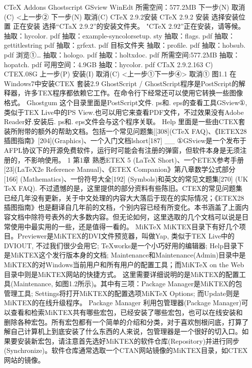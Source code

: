 \documentclass[UTF8]{ctexart}
\begin{document}
CTeX Addons
Ghostscript
GSview
WinEdt
所需空间：577.2MB
下一步(N)
取消(C)
<上一步②
下一步(N)
取消(C)
CTeX 2.9.2安装
CTeX 2.9.2 安装
选择安装位置
正在安装
选择“CTaX 2.9.2”的安装文件夹。
"CTeX 2.92”正在安装，请等候。
抽取：hycolor. pdf
抽取：example-syncolorsetup. sty
抽取：flags. pdf
抽取：gettitlestring pdf
抽取：grfext. pdf
目标文件夹
抽取：profile. pdf
抽取：hobsub. pdf
浏览①…
抽取：hologo. pdf
抽取：holtxdoc. pdf
所需空间:577.2MB
抽取：hopatch. pdf
可用空间：4.9GB
抽取：hycolor. pdf
CTaX 2.9.2.163 C) CTEX.08G
上一步(P)
安装(I)
取消(C)
<上一步①下一步④>
取消①
图1.1 在Windows7中安装CTEX 套装2.9
GhostScript
/
GhostScript程序是PostScript的解释器，许多TEX程序都依赖它工作。在命令行下经常还可以使用它转换一些图像格式。
Ghostgum
这个目录里面是PostScript文件. ps和. eps的查看工具GSview①, 类似于TEX Live中的PS View.也可以用它来查看PDF文件，不过效果没有Adobe Reader好.安装后. ps和. eps文件会与这个程序关联。
Help
里面是一些由CTEX套装所附带的额外的帮助文档。包括一个常见问题集[[308](CTeX FAQ)、《IETEX28插图指南》[204](Graphics)、一个入门文档lshort[187]
__
①GSview是一个发布于AFPL协议下的开源免费软件，运行时可能会有注册的弹窗，但软件本身是无须注册的，不影响使用。
1
第1章	熟悉ETEX	5
(LaTeX Short)、一个ETEX参考手册[23](LaTeX2e Reference Manual)、《ETEX Companion》第八章数学公式部分[166] (Mathematics)、一份符号大全[192] (Symbols)和英文的常见文题集[270] (UK TeX FAQ).
不过遗憾的是，这里提供的部分资料有些陈旧。CTEX的常见问题集已经几年没有更新，关于中文处理的内容大大落后于现在的实际情况；《ETEX28插图指南》也是翻译自几年前的文档，个别内容已经有所变化。本书涵盖了上面内容文档中除符号表外的大多数内容。但无论如何，这里选取的几个文档可以说是日常使用中最实用的一些，还是值得一看的。
MiKTeX
MiKTEX目录下有好几个项目。Previewer是MiKTEX的DVI文件预览器，叫做Yap, 类似于TEX Live中的DVIOUT, 不过我们很少会用它; TeXworks是一个小巧好用的编辑器; Help目录下是MiKTEX这个发行版本身的文档; Maintenance和Maintenance(Admin)目录中是MiKTEX的对Windows当前用户和所有用户的配置工具；而MiKTeX on the Web目录中则是MiKTEX网站的快捷方式。
这里需要详细说明的是MiKTEX的配置工具(Maintenance, 如图1.2所示)。其中有三项：Package Manager是MiKTEX的包管理工具; Settings将打开MiKTEX的配置选项MiKTeX Options; 而Update则是MiKTEX的在线升级程序。
Package Manager
利用包管理器(Package Manager)可以查看和检索MiKTEX共有哪些宏包，已经安装了哪些宏包，也可以在线安装和删除各种宏包。所有宏包都有一个简单的介绍和分类，对于喜欢刨根问底，打算了解自己计算机上到底安装了什么东西的人来说，包管理器是一个很好的切入口。如果要安装新宏包，请注意首先选好MiKTEX的软件仓库(Repository)并进行同步(Synchronize)。软件仓库通常选取一个CTAN网站镜像的MiKTEX目录，如CTEX网站的镜像。
\end{document}
